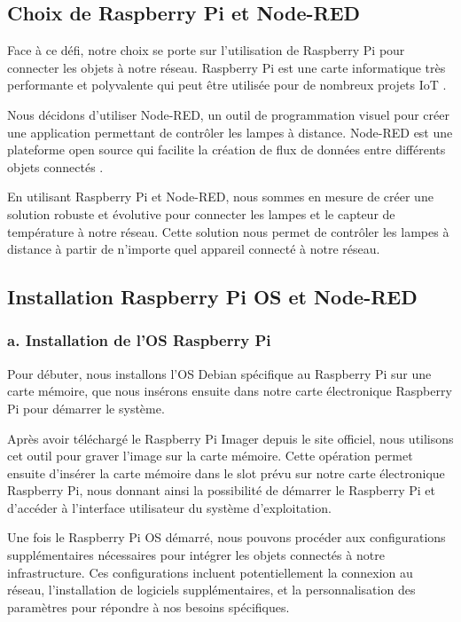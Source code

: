 \subsection{Choix de Raspberry Pi et Node-RED}

Face à ce défi, notre choix se porte sur l'utilisation de Raspberry Pi pour connecter les objets à notre réseau. Raspberry Pi est une carte informatique très performante et polyvalente qui peut être utilisée pour de nombreux projets IoT \cite{richardson2012getting}.

Nous décidons d'utiliser Node-RED, un outil de programmation visuel pour créer une application permettant de contrôler les lampes à distance. Node-RED est une plateforme open source qui facilite la création de flux de données entre différents objets connectés \cite{lekic2018iot}.

En utilisant Raspberry Pi et Node-RED, nous sommes en mesure de créer une solution robuste et évolutive pour connecter les lampes et le capteur de température à notre réseau. Cette solution nous permet de contrôler les lampes à distance à partir de n'importe quel appareil connecté à notre réseau.

\subsection{Installation Raspberry Pi OS et Node-RED}

\subsubsection{a. Installation de l'OS Raspberry Pi}

Pour débuter, nous installons l'OS Debian spécifique au Raspberry Pi sur une carte mémoire, que nous insérons ensuite dans notre carte électronique Raspberry Pi pour démarrer le système.

Après avoir téléchargé le Raspberry Pi Imager depuis le site officiel, nous utilisons cet outil pour graver l'image sur la carte mémoire. Cette opération permet ensuite d'insérer la carte mémoire dans le slot prévu sur notre carte électronique Raspberry Pi, nous donnant ainsi la possibilité de démarrer le Raspberry Pi et d'accéder à l'interface utilisateur du système d'exploitation.

Une fois le Raspberry Pi OS démarré, nous pouvons procéder aux configurations supplémentaires nécessaires pour intégrer les objets connectés à notre infrastructure. Ces configurations incluent potentiellement la connexion au réseau, l'installation de logiciels supplémentaires, et la personnalisation des paramètres pour répondre à nos besoins spécifiques.

